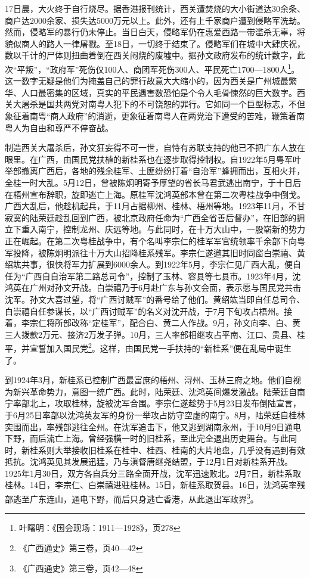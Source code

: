 17日晨，大火终于自行烧尽。据香港报刊统计，西关遭焚烧的大小街道达30余条、商户达2000余家、损失达5000万元以上。此外，还有上千家商户遭到侵略军洗劫。然而，侵略军的暴行仍未停止。当日白天，侵略军仍在惠爱西路一带滥杀无辜，将貌似商人的路人一律屠戮。至18日，一切终于结束了。侵略军们在城中大肆庆祝，数以千计的尸体则扭曲着倒在西关闷烧的废墟中。据孙文政府发布的统计数字，此次“平叛”，“政府军”死伤仅100人、商团军死伤300人、平民死亡1700—1800人\footnote{叶曙明：《国会现场：1911—1928》，页278}。这一数字无疑是他们为掩盖自己的罪行故意大大缩小的，因为西关是广州城最繁华、人口最密集的区域，真实的平民遇害数恐怕是个令人毛骨悚然的巨大数字。西关大屠杀是国共两党对南粤人犯下的不可饶恕的罪行。它如同一个巨型标志，不但象征着南粤“商人政府”的消逝，更象征着南粤人在两党治下遭受的苦难，鞭策着南粤人为自由和尊严不停奋战。

制造西关大屠杀后，孙文狂妄得不可一世，自恃有苏联支持的他已不把广东人放在眼里。在广西，由国民党扶植的新桂系也在逐步取得控制权。自1922年5月粤军叶举部撤离广西后，各地的残余桂军、土匪纷纷打着“自治军”蜂拥而出，互相火并，全桂一时大乱。5月12日，曾被陈炯明寄予厚望的省长马君武逃出南宁，于十日后在梧州宣布辞职，旋即逃亡上海。原桂军沈鸿英部本曾在第二次粤桂战争中倒戈。广西大乱后，他趁机起兵，于11月占据柳州、桂林、梧州等地。1923年11月，不甘寂寞的陆荣廷趁乱回到广西，被北京政府任命为“广西全省善后督办”，在旧部的拥立下重入南宁，控制龙州、庆远等地。与此同时，在十万大山中，一股崭新的势力正在崛起。在第二次粤桂战争中，有个名叫李宗仁的桂军军官统领率千余部下向粤军投降，被陈炯明派往十万大山招降桂系残军。李宗仁遂邀其旧时同窗白崇禧、黄绍竑共事，很快将军力扩展到6000余人。到1922年5月，李宗仁见广西大乱，便自任为“广西自自治军第二路总司令”，控制了玉林、容县等七县市。1923年4月，沈鸿英在广州对孙文开战。白崇禧乃于6月赴广东与孙文会面，表示愿与国民党共击沈军。孙文大喜过望，将“广西讨贼军”的番号给了他们。黄绍竑当即自任总司令、白崇禧自任参谋长，以“广西讨贼军”的名义对沈开战，于7月下旬攻占梧州。接着，李宗仁将所部改称“定桂军”，配合白、黄二人作战。9月，孙文向李、白、黄三人拨款2万元、接济2万发子弹。10月，三人率部相继攻占平南、江口、贵县、桂平，并宣誓加入国民党\footnote{《广西通史》第三卷，页40—42}。这样，由国民党一手扶持的“新桂系”便在乱局中诞生了。

到1924年3月，新桂系已控制广西最富庶的梧州、浔州、玉林三府之地。他们自视为新兴革命势力，意图一统广西。此时，陆荣廷、沈鸿英间爆发激战。陆荣廷自南宁率部北上，攻取桂林，旋被沈军合围。李宗仁遂趁势于5月23日发布倒陆宣言，于6月25日率部以沈鸿英友军的身份一举攻占防守空虚的南宁。8月，陆荣廷自桂林突围而出，率残部逃往全州。在沈军追击下，他又逃到湖南永州，于10月9日通电下野，而后流亡上海。曾经强横一时的旧桂系，至此完全退出历史舞台。与此同时，新桂系则大举接收旧桂系在桂中、桂西、桂南的大片地盘，几乎没有遇到有效抵抗。沈鸿英见其发展迅猛，乃与滇督唐继尧结盟，于12月1日对新桂系开战。1925年1月30日，双方各自兵分三路全面开战，沈军迅速败北。2月7日，新桂系取桂林。14日，李宗仁、白崇禧进驻桂林。15日，新桂系取贺县。16日，沈鸿英率残部逃至广东连山，通电下野，而后只身逃亡香港，从此退出军政界\footnote{《广西通史》第三卷，页42—48}。

